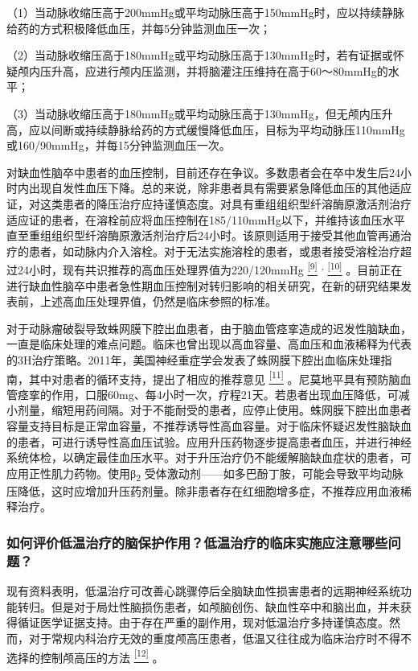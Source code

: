 （1）当动脉收缩压高于200mmHg或平均动脉压高于150mmHg时，应以持续静脉给药的方式积极降低血压，并每5分钟监测血压一次；

（2）当动脉收缩压高于180mmHg或平均动脉压高于130mmHg时，若有证据或怀疑颅内压升高，应进行颅内压监测，并将脑灌注压维持在高于60～80mmHg的水平；

（3）当动脉收缩压高于180mmHg或平均动脉压高于130mmHg，但无颅内压升高，应以间断或持续静脉给药的方式缓慢降低血压，目标为平均动脉压110mmHg或160/90mmHg，并每15分钟监测血压一次。

对缺血性脑卒中患者的血压控制，目前还存在争议。多数患者会在卒中发生后24小时内出现自发性血压下降。总的来说，除非患者具有需要紧急降低血压的其他适应证，对这类患者的降压治疗应持谨慎态度。对具有重组组织型纤溶酶原激活剂治疗适应证的患者，在溶栓前应将血压控制在185/110mmHg以下，并维持该血压水平直至重组组织型纤溶酶原激活剂治疗后24小时。该原则适用于接受其他血管再通治疗的患者，如动脉内介入溶栓。对于无法实施溶栓的患者，或患者接受溶栓治疗超过24小时，现有共识推荐的高血压处理界值为220/120mmHg
\protect\hyperlink{text00029.htmlux5cux23ch9-28}{\textsuperscript{{[}9{]}}}
\textsuperscript{,}
\protect\hyperlink{text00029.htmlux5cux23ch10-28}{\textsuperscript{{[}10{]}}}
。目前正在进行缺血性脑卒中患者急性期血压控制对转归影响的相关研究，在新的研究结果发表前，上述高血压处理界值，仍然是临床参照的标准。

对于动脉瘤破裂导致蛛网膜下腔出血患者，由于脑血管痉挛造成的迟发性脑缺血，一直是临床处理的难点问题。临床也曾出现以高血容量、高血压和血液稀释为代表的3H治疗策略。2011年，美国神经重症学会发表了蛛网膜下腔出血临床处理指南，其中对患者的循环支持，提出了相应的推荐意见
\protect\hyperlink{text00029.htmlux5cux23ch11-28}{\textsuperscript{{[}11{]}}}
。尼莫地平具有预防脑血管痉挛的作用，口服60mg、每4小时一次，疗程21天。若患者出现血压降低，可减小剂量，缩短用药间隔。对于不能耐受的患者，应停止使用。蛛网膜下腔出血患者容量支持目标是正常血容量，不推荐诱导性高血容量。对于临床怀疑迟发性脑缺血的患者，可进行诱导性高血压试验。应用升压药物逐步提高患者血压，并进行神经系统体检，以确定最佳血压水平。对于升压治疗仍不能缓解脑缺血症状的患者，可应用正性肌力药物。使用β\textsubscript{2}
受体激动剂------如多巴酚丁胺，可能会导致平均动脉压降低，这时应增加升压药剂量。除非患者存在红细胞增多症，不推荐应用血液稀释治疗。

\subsubsection{如何评价低温治疗的脑保护作用？低温治疗的临床实施应注意哪些问题？}

现有资料表明，低温治疗可改善心跳骤停后全脑缺血性损害患者的远期神经系统功能转归。但是对于局灶性脑损伤患者，如颅脑创伤、缺血性卒中和脑出血，并未获得循证医学证据支持。由于存在严重的副作用，现对低温治疗多持谨慎态度。然而，对于常规内科治疗无效的重度颅高压患者，低温又往往成为临床治疗时不得不选择的控制颅高压的方法
\protect\hyperlink{text00029.htmlux5cux23ch12-28}{\textsuperscript{{[}12{]}}}
。

